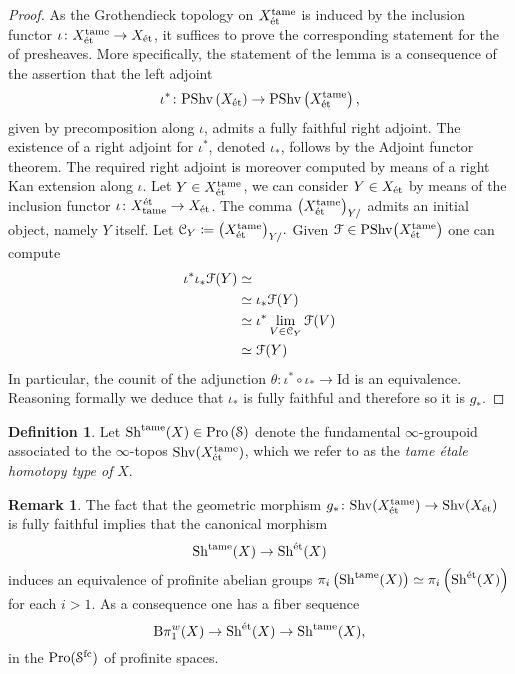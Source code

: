 \documentclass[10pt,a4paper]{amsart}
\numberwithin{equation}{subsection}
\theoremstyle{plain}
\theoremstyle{definition}
\newtheorem{defi}[theorem]{Definition}
\newtheorem{rema}[theorem]{Remark}
\theoremstyle{remark}
\numberwithin{equation}{section}
\begin{document}
\begin{proof} As the Grothendieck topology on $X_{\text{\'et}}^{\mathrm{tame}}$ is induced by the inclusion functor $\iota \colon X_{\text{\'et}}^{\mathrm{tame}} \to X_{\text{\'et}}$, it suffices to prove the corresponding statement for the \infcats of presheaves. More specifically,
the statement of the lemma is a consequence of the assertion that the left adjoint
	\[
		\iota^* \colon \mathrm{PShv} \left( X_{\text{\'et}} \right) \to \mathrm{PShv} \left( X^{\mathrm{tame}}_{\text{\'et}} \right),
	\]
given by precomposition along $\iota$,
admits a fully faithful right adjoint. The existence of a right adjoint for $\iota^*$, denoted $\iota_{*}$, follows by the Adjoint functor theorem. The required right adjoint is moreover computed by means of a right Kan extension along $
 \iota$. Let $Y \in X_{\text{\'et}}^{\mathrm{tame}}$, we can consider $Y \in X_{\text{\'et}}$ by means of the inclusion functor $\iota \colon X_{\mathrm{tame}}^{\text{\'et}} \to X_{\text{\'et}}$. The comma \infcat $\big( X^{\mathrm{tame}}_{\text{\'et}} \big)_{Y/}$ admits an initial object, namely $Y$ itself. Let
 $\mathcal C_Y \coloneqq \big( X_{\text{\'et}}^{\mathrm{tame}} \big)_{Y / }.$ Given $\mathcal{F} \in
 \mathrm{PShv} \big( X_{\text{\'et}}^{\mathrm{tame}} \big)$ one can compute 
 	\begin{align*}
		\iota^* \iota_* \mathcal{F}( Y) & \simeq   \\
		& \simeq \iota_* \mathcal{F}(Y) \\
		& \simeq \iota^*  \lim_{V \in \mathcal C_Y} \mathcal{F}(V)  \\
		& \simeq \mathcal{F}(Y)
	\end{align*}
In particular, the counit of the adjunction $\theta \colon \iota^* \circ \iota_* \to \mathrm{Id}$ is an equivalence. Reasoning formally we deduce that $\iota_*$ is fully faithful and therefore so it is $g_*$.
\end{proof}

\begin{defi}
Let $\mathrm{Sh}^{\mathrm{tame}}(X) \in \mathrm{Pro} \left( \mathcal S \right)$ denote the fundamental $\infty$-groupoid associated to the $\infty$-topos $\mathrm{Shv}(X_{\text{\'et}}^{\mathrm{tame}} )$, which we refer to as the \emph{tame \'etale homotopy type of} $X$.
\end{defi}

\begin{rema} \label{tame_vs_et}
The fact that the geometric morphism $g_* \colon \mathrm{Shv}(X_{\text{\'et}}^{\mathrm{tame}} ) \to \mathrm{Shv}(X_{\text{\'et}})$ is fully faithful implies that the canonical morphism 
	\[
		\mathrm{Sh}^{\mathrm{tame}} (X) \to \mathrm{Sh}^{\text{\'et}}(X)
	\]
induces an equivalence of profinite abelian groups $\pi_i \left( \mathrm{Sh}^{\mathrm{tame}} (X) \right) \simeq \pi_i \left( \mathrm{Sh}^{\text{\'et}}(X) \right)$ for each $i>1.$
As a consequence one has a fiber sequence
	\[
		\mathrm B \pi_1^w(X) \to \mathrm{Sh}^{\text{\'et}}(X) \to \mathrm{Sh}^{\mathrm{tame}}(X),
	\]
in the \infcat $\mathrm{Pro}(\mathcal S^{\mathrm{fc}})$ of profinite spaces.
\end{rema}
\end{document}

